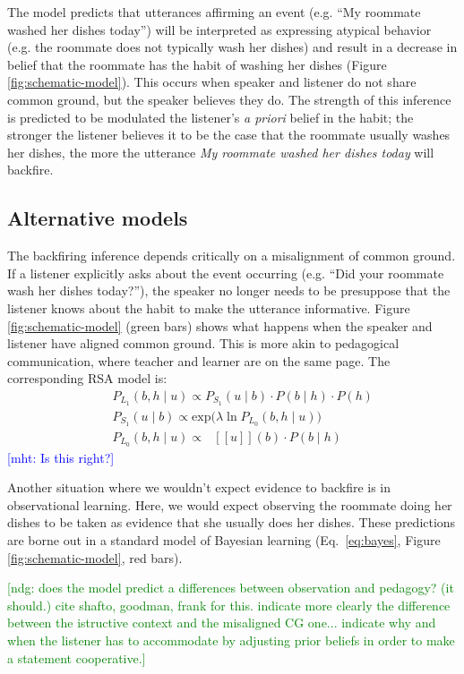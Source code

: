 \documentclass[10pt,letterpaper]{article}
\newcommand{\denote}[1]{\mbox{ $[\![ #1 ]\!]$}}
\newcommand{\ndg}[1]{\textcolor{Green}{[ndg: #1]}}
\newcommand{\mht}[1]{\textcolor{Blue}{[mht: #1]}}
\begin{document}
The model predicts that utterances affirming an event (e.g. ``My roommate washed her dishes today'') will be interpreted as expressing atypical behavior (e.g. the roommate does not typically wash her dishes) and result in a decrease in belief that the roommate has the habit of washing her dishes (Figure \ref{fig:schematic-model}).
This occurs when speaker and listener do not share common ground, but the speaker believes they do.
The strength of this inference is predicted to be modulated the listener's \emph{a priori} belief in the habit; the stronger the listener believes it to be the case that the roommate usually washes her dishes, the more the utterance \emph{My roommate washed her dishes today} will backfire. 

\subsection{Alternative models}

The backfiring inference depends critically on a misalignment of common ground. 
If a listener explicitly asks about the event occurring (e.g. ``Did your roommate wash her dishes today?''), the speaker no longer needs to be presuppose that the listener knows about the habit to make the utterance informative. 
Figure \ref{fig:schematic-model} (green bars) shows what happens when the speaker and listener have aligned common ground.
This is more akin to pedagogical communication, where teacher and learner are on the same page. 
The corresponding RSA model is:
\begin{eqnarray}
&&P_{L_1}(b, h \mid u)\propto P_{S_1}(u \mid b)\cdot P(b \mid h) \cdot P(h) \label{eq:L1mod}\\
&&P_{S_1}(u \mid b) \propto \mathrm{exp}({\lambda \ln P_{L_0}(b, h \mid u))} \label{eq:S1mod}\\
&&P_{L_0}(b, h \mid u)\propto \denote{u}(b) \cdot P(b \mid h) \label{eq:L0mod}
\end{eqnarray}
\mht{Is this right?}

Another situation where we wouldn't expect evidence to backfire is in observational learning.
Here, we would expect observing the roommate doing her dishes to be taken as evidence that she usually does her dishes. 
These predictions are borne out in a standard model of Bayesian learning (Eq.~\ref{eq:bayes}, Figure \ref{fig:schematic-model}, red bars).

\ndg{does the model predict a differences between observation and pedagogy? (it should.) cite shafto, goodman, frank for this. indicate more clearly the difference between the istructive context and the misaligned CG one... indicate why and when the listener has to accommodate by adjusting prior beliefs in order to make a statement cooperative.}
\end{document}
